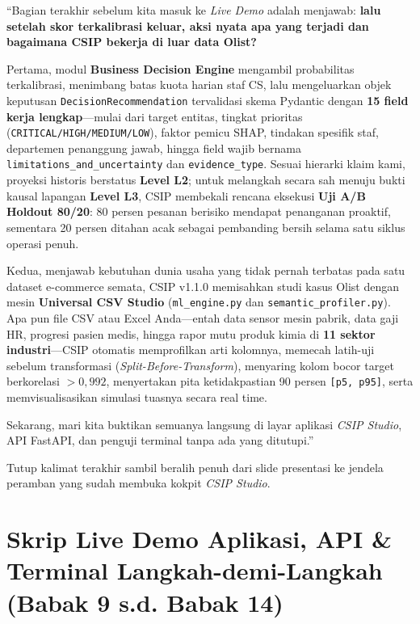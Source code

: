 \documentclass[11pt,a4paper,oneside]{book}
\newcommand{\code}[1]{{\small\nolinkurl{#1}}}
\begin{document}
\begin{scriptbox}
``Bagian terakhir sebelum kita masuk ke \emph{Live Demo} adalah menjawab: \textbf{lalu setelah skor terkalibrasi keluar, aksi nyata apa yang terjadi dan bagaimana CSIP bekerja di luar data Olist?}

Pertama, modul \textbf{Business Decision Engine} mengambil probabilitas terkalibrasi, menimbang batas kuota harian staf CS, lalu mengeluarkan objek keputusan \code{DecisionRecommendation} tervalidasi skema Pydantic dengan \textbf{15 field kerja lengkap}---mulai dari target entitas, tingkat prioritas (\code{CRITICAL/HIGH/MEDIUM/LOW}), faktor pemicu SHAP, tindakan spesifik staf, departemen penanggung jawab, hingga field wajib bernama \code{limitations_and_uncertainty} dan \code{evidence_type}. Sesuai hierarki klaim kami, proyeksi historis berstatus \textbf{Level L2}; untuk melangkah secara sah menuju bukti kausal lapangan \textbf{Level L3}, CSIP membekali rencana eksekusi \textbf{Uji A/B Holdout 80/20}: 80 persen pesanan berisiko mendapat penanganan proaktif, sementara 20 persen ditahan acak sebagai pembanding bersih selama satu siklus operasi penuh.

Kedua, menjawab kebutuhan dunia usaha yang tidak pernah terbatas pada satu dataset e-commerce semata, CSIP v1.1.0 memisahkan studi kasus Olist dengan mesin \textbf{Universal CSV Studio} (\code{ml_engine.py} dan \code{semantic_profiler.py}). Apa pun file CSV atau Excel Anda---entah data sensor mesin pabrik, data gaji HR, progresi pasien medis, hingga rapor mutu produk kimia di \textbf{11 sektor industri}---CSIP otomatis memprofilkan arti kolomnya, memecah latih-uji sebelum transformasi (\emph{Split-Before-Transform}), menyaring kolom bocor target berkorelasi \textbf{$> 0{,}992$}, menyertakan pita ketidakpastian 90 persen \code{[p5, p95]}, serta memvisualisasikan simulasi tuasnya secara real time.

Sekarang, mari kita buktikan semuanya langsung di layar aplikasi \emph{CSIP Studio}, API FastAPI, dan penguji terminal tanpa ada yang ditutupi.''
\end{scriptbox}

\begin{tipbox}
Tutup kalimat terakhir sambil beralih penuh dari slide presentasi ke jendela peramban yang sudah membuka kokpit \emph{CSIP Studio}.
\end{tipbox}


\chapter{Skrip Live Demo Aplikasi, API \& Terminal Langkah-demi-Langkah (Babak 9 s.d. Babak 14)}
\end{document}
